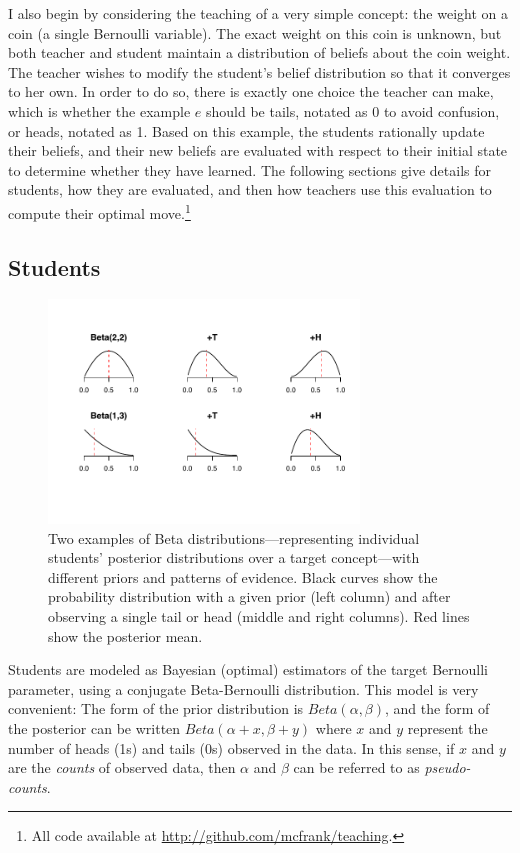 \documentclass[10pt,letterpaper]{article}
\begin{document}
I also begin by considering the teaching of a very simple concept: the weight on a coin (a single Bernoulli variable). The exact weight on this coin is unknown, but both teacher and student maintain a distribution of beliefs about the coin weight. The teacher wishes to modify the student's belief distribution so that it converges to her own. In order to do so, there is exactly one choice the teacher can make, which is whether the example $e$ should be tails, notated as 0 to avoid confusion, or heads, notated as 1. Based on this example, the students rationally update their beliefs, and their new beliefs are evaluated with respect to their initial state to determine whether they have learned. The following sections give details for students, how they are evaluated, and then how teachers use this evaluation to compute their optimal move.\footnote{All code available at \url{http://github.com/mcfrank/teaching}.}

\subsection{Students}

\begin{figure}[t]
\begin{center}
\includegraphics[width=3.25in]{figures/students2.pdf}
\end{center}
\caption{\label{fig:students} Two examples of Beta distributions---representing individual students' posterior distributions over a target concept---with different priors and patterns of evidence. Black curves show the probability distribution with a given prior (left column) and after observing a single tail or head (middle and right columns). Red lines show the posterior mean.}
\end{figure}

Students are modeled as Bayesian (optimal) estimators of the target Bernoulli parameter, using a conjugate Beta-Bernoulli distribution. This model is very convenient: The form of the prior distribution is $Beta(\alpha,\beta)$, and the form of the posterior can be written $Beta(\alpha+x,\beta+y)$ where $x$ and $y$ represent the number of heads (1s) and tails (0s) observed in the data. In this sense, if $x$ and $y$ are the \emph{counts} of observed data, then $\alpha$ and $\beta$ can be referred to as \emph{pseudo-counts}.
\end{document}
